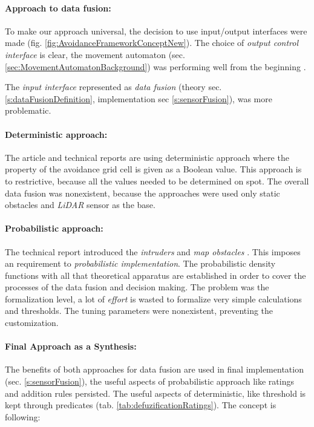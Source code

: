 \paragraph{Approach to data fusion:} To make our approach universal, the decision to use input/output interfaces were made (fig. \ref{fig:AvoidanceFrameworkConceptNew}). The choice of \emph{output control interface} is clear, the movement automaton (sec. \ref{sec:MovementAutomatonBackground}) was performing well from the beginning \cite{gomola2017optimal,gomola2017mpc}.

The \emph{input interface} represented as \emph{data fusion} (theory sec. \ref{s:dataFusionDefinition}, implementation sec \ref{s:sensorFusion}), was more problematic.

\paragraph{Deterministic approach:} The article \cite{gomola2017obstacle} and technical reports \cite{gomola2017mpc,gomola2017optimal} are using deterministic approach where the property of the avoidance grid cell is given as a Boolean value. This approach is to restrictive, because all the values needed to be determined on spot. The overall data fusion was nonexistent, because the approaches were used only static obstacles and \emph{LiDAR} sensor as the base. 

\paragraph{Probabilistic approach:} The technical report \cite{gomola2017probabilistic} introduced the \emph{intruders} and \emph{map obstacles} \cite{cernamaria2018}. This imposes an requirement to \emph{probabilistic implementation}. The probabilistic density functions with all that theoretical apparatus are established in order to cover the processes of the data fusion and decision making. The problem was the formalization level, a lot of \emph{effort} is wasted to formalize very simple calculations and thresholds. The tuning parameters were nonexistent, preventing the customization.

\paragraph{Final Approach as a Synthesis:} The benefits of both approaches for data fusion are used in final implementation (sec. \ref{s:sensorFusion}), the useful aspects of probabilistic approach like ratings and addition rules persisted. The useful aspects of deterministic, like threshold is kept through predicates (tab. \ref{tab:defuzificationRatings}). The concept is following:

